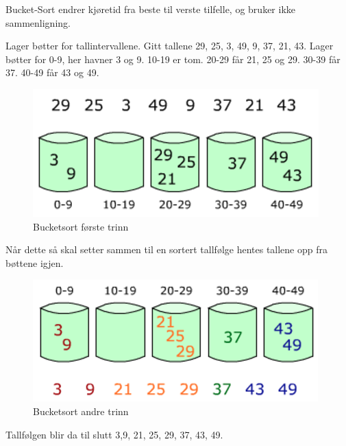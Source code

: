 \noindent Bucket-Sort endrer kjøretid fra beste til verste tilfelle, og bruker ikke sammenligning.

\begin{boxed}
Lager bøtter for tallintervallene. Gitt tallene 29, 25, 3, 49, 9, 37, 21, 43. Lager bøtter for 0-9, her havner 3 og 9. 10-19 er tom. 20-29 får 21, 25 og 29. 30-39 får 37. 40-49 får 43 og 49.

\begin{figure}[H]
\includegraphics[scale=0.5]{images/bucketsort1}
\centering %
\caption{Bucketsort første trinn}
\label{fig:bucketsort1}
\end{figure}

Når dette så skal setter sammen til en sortert tallfølge hentes tallene opp fra bøttene igjen.

\begin{figure}[H]
\includegraphics[scale=0.5]{images/bucketsort2}
\centering %
\caption{Bucketsort andre trinn}
\label{fig:bucketsort2}
\end{figure}

Tallfølgen blir da til slutt 3,9, 21, 25, 29, 37, 43, 49.
\end{boxed}

